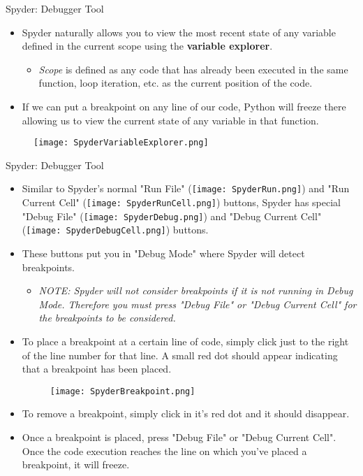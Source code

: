 \documentclass[10pt, aspectratio=169]{beamer}
\begin{document}
\begin{frame}{Spyder: Debugger Tool}
    \label{frame:spyderdebug}
    \begin{itemize}
        \item Spyder naturally allows you to view the most recent state of any variable defined in the current scope using the \textbf{variable explorer}.
        \begin{itemize}
            \item \textit{Scope} is defined as any code that has already been executed in the same function, loop iteration, etc. as the current position of the code.
        \end{itemize}
        \item If we can put a breakpoint on any line of our code, Python will freeze there allowing us to view the current state of any variable in that function.

    \end{itemize}

    \begin{figure}
        \texttt{[image: SpyderVariableExplorer.png]}
    \end{figure}
\end{frame}

\begin{frame}{Spyder: Debugger Tool}
    \begin{itemize}
        \item Similar to Spyder's normal "Run File" (\texttt{[image: SpyderRun.png]}) and "Run Current Cell" (\texttt{[image: SpyderRunCell.png]}) buttons, Spyder has special "Debug File" (\texttt{[image: SpyderDebug.png]}) and "Debug Current Cell" (\texttt{[image: SpyderDebugCell.png]}) buttons.
        \item These buttons put you in "Debug Mode" where Spyder will detect breakpoints. 
        \begin{itemize}
            \item \textit{NOTE: Spyder will not consider breakpoints if it is not running in Debug Mode. Therefore you must press "Debug File" or "Debug Current Cell" for the breakpoints to be considered.}
        \end{itemize}
        \item To place a breakpoint at a certain line of code, simply click just to the right of the line number for that line. A small red dot should appear indicating that a breakpoint has been placed.
        \begin{figure}
            \texttt{[image: SpyderBreakpoint.png]}
        \end{figure}
        \item To remove a breakpoint, simply click in it's red dot and it should disappear.
        \item Once a breakpoint is placed, press "Debug File" or "Debug Current Cell". Once the code execution reaches the line on which you've placed a breakpoint, it will freeze.
    \end{itemize}
\end{frame}
\end{document}

